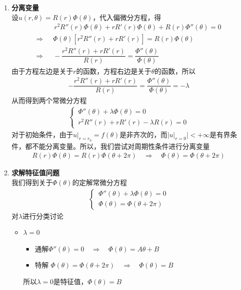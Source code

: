\begin{enumerate}[\textbf{步骤}1 ]
	\item \textbf{分离变量}\\
	设$u(r,\theta) = R(r) \Phi(\theta)$，代入偏微分方程，得
	\begin{align*}
		& \,\,\,\,\, r^2 R''(r)\Phi(\theta) + r R'(r)\Phi(\theta) +R(r) \Phi''(\theta) = 0\\
		\Rightarrow & \,\,\,\, \Phi(\theta)\left[r^2 R''(r) + rR'(r)\right] = R(r)\Phi(\theta)\\
		\Rightarrow & \,\,\,\, -\dfrac{r^2 R''(r) + rR'(r)}{R(r)}=\dfrac{\Phi''(\theta)}{\Phi(\theta)}
	\end{align*}
	由于方程左边是关于$r$的函数，方程右边是关于$\theta$的函数，所以
	\begin{align*}
		-\dfrac{r^2 R''(r) + rR'(r)}{R(r)}=\dfrac{\Phi''(\theta)}{\Phi(\theta)} = -\lambda
	\end{align*}
	从而得到两个常微分方程
	\begin{align*}
		\begin{cases}
			\, \Phi''(\theta) + \lambda \Phi(\theta) = 0\\
			\, r^2 R''(r) + rR'(r) - \lambda R(r) = 0
		\end{cases}
	\end{align*}
	对于初始条件，由于$u|_{r =r_0} = f(\theta)$是非齐次的，而$\big|u|_{r = 0}\big|<+\infty$是有界条件，都不能分离变量。所以，我们尝试对周期性条件进行分离变量
	\begin{align*}
		R(r) \Phi(\theta) = R(r) \Phi(\theta + 2\pi) \quad \Rightarrow \quad \Phi(\theta) = \Phi(\theta + 2\pi) 
	\end{align*}
	
	\item \textbf{求解特征值问题}\\
	我们得到关于$\Phi(\theta)$的定解常微分方程
	\begin{align}
		\begin{cases}
			\, \Phi''(\theta) + \lambda \Phi(\theta) = 0\\
			\, \Phi(\theta) = \Phi(\theta + 2\pi)
		\end{cases}
	\end{align}
	对$\lambda$进行分类讨论
	\begin{itemize}
		\item $\lambda = 0$
		\begin{itemize}
			\item 通解\quad $\Phi''(\theta) =0 \quad \Rightarrow \quad \Phi(\theta) = A \theta + B$
			\item 特解 \quad $\Phi(\theta) = \Phi(\theta + 2\pi) \quad \Rightarrow \quad \Phi(\theta) = B$
		\end{itemize}
		所以$\lambda = 0$是特征值，$\Phi(\theta) = B$
	

\end{itemize}
\end{enumerate}
